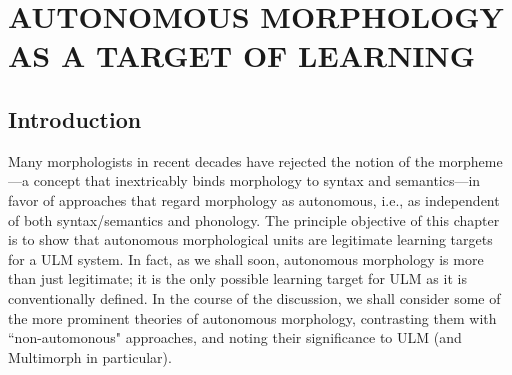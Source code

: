 \chapter{AUTONOMOUS MORPHOLOGY AS A TARGET OF LEARNING}
\label{autonomous}

%
\section{Introduction}
Many morphologists in recent decades have rejected the notion of the morpheme---a concept that inextricably binds morphology to syntax and semantics---in favor of approaches that regard morphology as autonomous, i.e., as independent 
of both syntax/semantics and phonology. The principle objective of this chapter is to 
show that autonomous morphological units are legitimate learning targets for a \ac{ULM}  system. In fact, as we shall soon, autonomous morphology is more than just legitimate; it is the only possible learning target for \ac{ULM}  as it is conventionally defined. %
In the course of the discussion, we shall consider some of the more prominent theories of autonomous morphology, contrasting them with ``non-automonous" approaches, and  noting their significance to \ac{ULM} (and Multimorph in particular).

